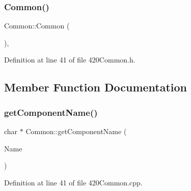 \mbox{\label{class_common_ab0898f6608707a3e07c22d88ecdae661}} 
\subsubsection{\texorpdfstring{Common()}{Common()}\hspace{0.1cm}{\footnotesize\ttfamily [4/4]}}
{\footnotesize\ttfamily Common\+::\+Common (\begin{DoxyParamCaption}{ }\end{DoxyParamCaption})\hspace{0.3cm}{\ttfamily [inline]}, {\ttfamily [protected]}}



Definition at line 41 of file 420\+Common.\+h.



\subsection{Member Function Documentation}
\mbox{\label{class_common_a86553d0d8ffabfd97236aa54ca2ba8f1}} 
\subsubsection{\texorpdfstring{get\+Component\+Name()}{getComponentName()}\hspace{0.1cm}{\footnotesize\ttfamily [1/2]}}
{\footnotesize\ttfamily char $\ast$ Common\+::get\+Component\+Name (\begin{DoxyParamCaption}\item[{const \+\_\+\+\_\+\+Flash\+String\+Helper $\ast$}]{Name }\end{DoxyParamCaption})}



Definition at line 41 of file 420\+Common.\+cpp.

